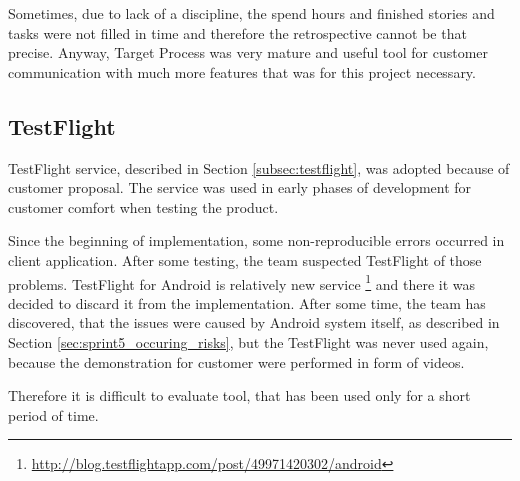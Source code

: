 Sometimes, due to lack of a discipline, the spend hours and finished stories and tasks were not filled in time and therefore the retrospective cannot be that precise.
Anyway, Target Process was very mature and useful tool for customer communication with much more features that was for this project necessary.


\subsection{TestFlight}
TestFlight service, described in Section \ref{subsec:testflight}, was adopted because of customer proposal.
The service was used in early phases of development for customer comfort when testing the product.

Since the beginning of implementation, some non-reproducible errors occurred in client application.
After some testing, the team suspected TestFlight of those problems.
TestFlight for Android is relatively new service \footnote{\url{http://blog.testflightapp.com/post/49971420302/android}} and there it was decided to discard it from the implementation.
After some time, the team has discovered, that the issues were caused by Android system itself, as described in Section \ref{sec:sprint5_occuring_risks}, but the TestFlight was never used again, because the demonstration for customer were performed in form of videos.
 
Therefore it is difficult to evaluate tool, that has been used only for a short period of time.

